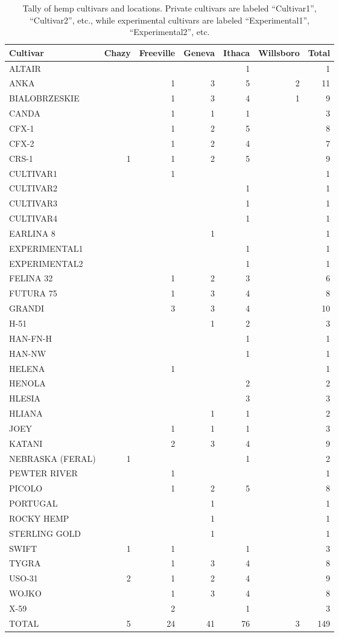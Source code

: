 \documentclass[
]{agujournal2019}
\begin{document}
\begin{longtable}[]{@{}lrrrrrr@{}}

\caption{\label{tbl-hemp_provenance}Tally of hemp cultivars and
locations. Private cultivars are labeled ``Cultivar1'', ``Cultivar2'',
etc., while experimental cultivars are labeled ``Experimental1'',
``Experimental2'', etc.}

\tabularnewline

\toprule\noalign{}
Cultivar & Chazy & Freeville & Geneva & Ithaca & Willsboro & Total \\
\midrule\noalign{}
\endhead
\bottomrule\noalign{}
\endlastfoot
ALTAIR & & & & 1 & & 1 \\
ANKA & & 1 & 3 & 5 & 2 & 11 \\
BIALOBRZESKIE & & 1 & 3 & 4 & 1 & 9 \\
CANDA & & 1 & 1 & 1 & & 3 \\
CFX-1 & & 1 & 2 & 5 & & 8 \\
CFX-2 & & 1 & 2 & 4 & & 7 \\
CRS-1 & 1 & 1 & 2 & 5 & & 9 \\
CULTIVAR1 & & 1 & & & & 1 \\
CULTIVAR2 & & & & 1 & & 1 \\
CULTIVAR3 & & & & 1 & & 1 \\
CULTIVAR4 & & & & 1 & & 1 \\
EARLINA 8 & & & 1 & & & 1 \\
EXPERIMENTAL1 & & & & 1 & & 1 \\
EXPERIMENTAL2 & & & & 1 & & 1 \\
FELINA 32 & & 1 & 2 & 3 & & 6 \\
FUTURA 75 & & 1 & 3 & 4 & & 8 \\
GRANDI & & 3 & 3 & 4 & & 10 \\
H-51 & & & 1 & 2 & & 3 \\
HAN-FN-H & & & & 1 & & 1 \\
HAN-NW & & & & 1 & & 1 \\
HELENA & & 1 & & & & 1 \\
HENOLA & & & & 2 & & 2 \\
HLESIA & & & & 3 & & 3 \\
HLIANA & & & 1 & 1 & & 2 \\
JOEY & & 1 & 1 & 1 & & 3 \\
KATANI & & 2 & 3 & 4 & & 9 \\
NEBRASKA (FERAL) & 1 & & & 1 & & 2 \\
PEWTER RIVER & & 1 & & & & 1 \\
PICOLO & & 1 & 2 & 5 & & 8 \\
PORTUGAL & & & 1 & & & 1 \\
ROCKY HEMP & & & 1 & & & 1 \\
STERLING GOLD & & & 1 & & & 1 \\
SWIFT & 1 & 1 & & 1 & & 3 \\
TYGRA & & 1 & 3 & 4 & & 8 \\
USO-31 & 2 & 1 & 2 & 4 & & 9 \\
WOJKO & & 1 & 3 & 4 & & 8 \\
X-59 & & 2 & & 1 & & 3 \\
TOTAL & 5 & 24 & 41 & 76 & 3 & 149 \\


\end{longtable}
\end{document}
